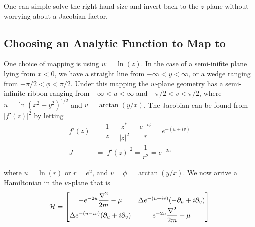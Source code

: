 One can simple solve the right hand size and invert back to the $z$-plane without worrying about a Jacobian factor.

\subsection{Choosing an Analytic Function to Map to}

One choice of mapping is using $w = \ln(z)$.
In the case of a semi-inifite plane lying from $x<0$, we have a straight line from $-\infty<y<\infty$, or a wedge ranging from $-\pi/2<\phi<\pi/2$.
Under this mapping the $w$-plane geometry has a semi-infinite ribbon ranging from $-\infty<u<\infty$ and $-\pi/2<v<\pi/2$, where $u = \ln(x^2+y^2)^{1/2}$ and $v = \arctan(y/x)$.
The Jacobian can be found from $|f'(z)|^2$ by letting
\begin{align*}
  f'(z) &= \dfrac{1}{z} = \dfrac{z^*}{|z|^2} = \dfrac{e^{-i\phi}}{r} = e^{-(u+iv)} \\
  J &= |f'(z)|^2 = \dfrac{1}{r^2} = e^{-2u}
\end{align*}

where $u = \ln(r)$ or $r = e^u$, and $v = \phi = \arctan(y/x)$.
We now arrive a Hamiltonian in the $w$-plane that is
\begin{align}
  \mathcal{H} = 
  \begin{bmatrix}
    -e^{-2u}\dfrac{\nabla^2}{2m} - \mu & \Delta e^{-(u+iv)} (-\partial_u + i \partial_v) \\
    \Delta e^{-(u-iv)}(\partial_u +i\partial_v) & e^{-2u}\dfrac{\nabla^2}{2m} + \mu
  \end{bmatrix}
\end{align}
